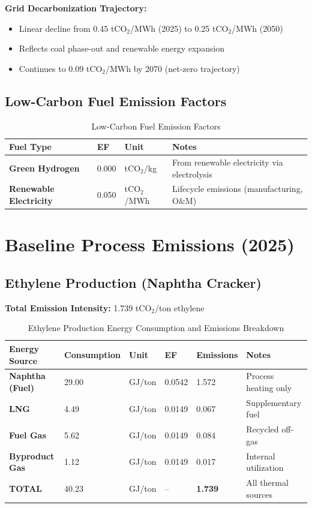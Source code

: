 \documentclass[11pt,a4paper]{report}
\newcommand{\tco}{tCO$_2$}
\begin{document}
\textbf{Grid Decarbonization Trajectory:}
\begin{itemize}[leftmargin=*]
    \item Linear decline from 0.45 \tco/MWh (2025) to 0.25 \tco/MWh (2050)
    \item Reflects coal phase-out and renewable energy expansion
    \item Continues to 0.09 \tco/MWh by 2070 (net-zero trajectory)
\end{itemize}

\section{Low-Carbon Fuel Emission Factors}

\begin{table}[H]
\centering
\caption{Low-Carbon Fuel Emission Factors}
\begin{tabular}{p{5cm}p{3cm}p{2cm}p{5cm}}
\toprule
\textbf{Fuel Type} & \textbf{EF} & \textbf{Unit} & \textbf{Notes} \\
\midrule
\textbf{Green Hydrogen} & 0.000 & \tco/kg & From renewable electricity via electrolysis \\
\textbf{Renewable Electricity} & 0.050 & \tco/MWh & Lifecycle emissions (manufacturing, O\&M) \\
\bottomrule
\end{tabular}
\label{tab:lowcarbon-ef}
\end{table}

\clearpage

\chapter{Baseline Process Emissions (2025)}

\section{Ethylene Production (Naphtha Cracker)}

\textbf{Total Emission Intensity:} 1.739 \tco/ton ethylene

\begin{table}[H]
\centering
\caption{Ethylene Production Energy Consumption and Emissions Breakdown}
\begin{tabular}{p{4cm}p{2.5cm}p{1.5cm}p{2cm}p{2cm}p{3cm}}
\toprule
\textbf{Energy Source} & \textbf{Consumption} & \textbf{Unit} & \textbf{EF} & \textbf{Emissions} & \textbf{Notes} \\
\midrule
\textbf{Naphtha (Fuel)} & 29.00 & GJ/ton & 0.0542 & 1.572 & Process heating only \\
\textbf{LNG} & 4.49 & GJ/ton & 0.0149 & 0.067 & Supplementary fuel \\
\textbf{Fuel Gas} & 5.62 & GJ/ton & 0.0149 & 0.084 & Recycled off-gas \\
\textbf{Byproduct Gas} & 1.12 & GJ/ton & 0.0149 & 0.017 & Internal utilization \\
\midrule
\textbf{TOTAL} & 40.23 & GJ/ton & -- & \textbf{1.739} & All thermal sources \\
\bottomrule
\end{tabular}
\label{tab:ethylene-baseline}
\end{table}
\end{document}
